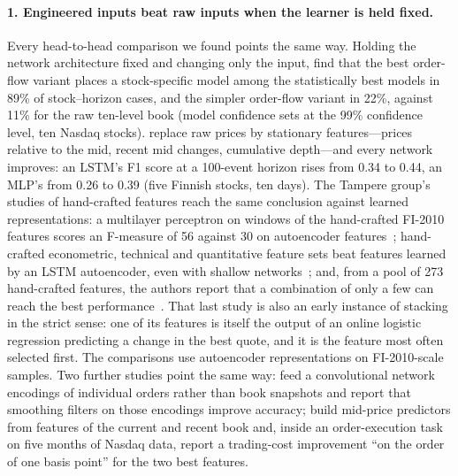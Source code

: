 \paragraph{1. Engineered inputs beat raw inputs when the learner is held fixed.} Every head-to-head
comparison we found points the same way. Holding the network architecture fixed and changing only
the input, \citet{lucchese2024} find that the best order-flow variant places a stock-specific model among the
statistically best models in 89\% of stock--horizon cases, and the simpler order-flow variant in 22\%, against 11\% for
the raw ten-level book (model
confidence sets at the 99\% confidence level, ten Nasdaq stocks). \citet{tsantekidis2020stationary} replace raw prices
by stationary features---prices relative to the mid, recent mid changes, cumulative depth---and every
network improves: an LSTM's F1 score at a 100-event horizon rises from 0.34 to 0.44, an MLP's from 0.26 to
0.39 (five Finnish stocks, ten days). The Tampere group's studies of hand-crafted features reach the same
conclusion against learned representations: a multilayer perceptron on windows of the hand-crafted FI-2010
features scores an F-measure of 56 against 30 on autoencoder features~\citep{nousi2019}; hand-crafted
econometric, technical and quantitative feature sets beat features learned by an LSTM autoencoder, even
with shallow networks~\citep{ntakaris2019access}; and, from a pool of 273 hand-crafted features, the
authors report that a combination of only a few can reach the best performance~\citep{ntakaris2020plos}. That last study is also an early instance of
stacking in the strict sense: one of its features is itself the output of an online logistic regression
predicting a change in the best quote, and it is the feature most often selected first. The comparisons
use autoencoder representations on FI-2010-scale samples. Two
further studies point the same way: \citet{tashiro2019} feed a convolutional network
encodings of individual orders rather than book snapshots and report that smoothing filters on those encodings
improve accuracy; \citet{palguna2016} build mid-price predictors from features of the current and recent book
and, inside an order-execution task on five months of Nasdaq data, report a trading-cost improvement ``on the
order of one basis point'' for the two best features.

